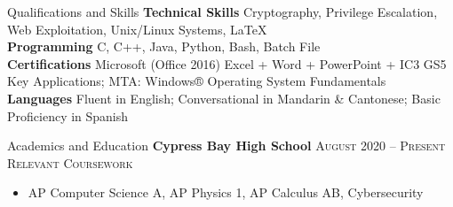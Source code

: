 \bigskip

\begin{resume_section}{Qualifications and Skills}
	\textbf{Technical Skills} \> Cryptography, Privilege Escalation, Web Exploitation, Unix/Linux Systems, \LaTeX \\
	\textbf{Programming} \> C, C++, Java, Python, Bash, Batch File \\
	\textbf{Certifications} \> Microsoft (Office 2016) Excel + Word + PowerPoint + IC3 GS5 Key Applications; MTA: Windows® Operating System Fundamentals \\
	\textbf{Languages} \> Fluent in English; Conversational in Mandarin \& Cantonese; Basic Proficiency in Spanish
\end{resume_section}

\bigskip

\begin{resume_section}{Academics and Education}
	\textbf{Cypress Bay High School} \hspace*{\fill} \textsc{August 2020 -- Present} \\
	\small
	\textsc{Relevant Coursework}

	\vspace*{-0.05in}

	\begin{itemize}
		\setlength{\labelsep}{0.1in}
		\item AP Computer Science A, AP Physics 1, AP Calculus AB, Cybersecurity
	\end{itemize}
\end{resume_section}

\bigskip

